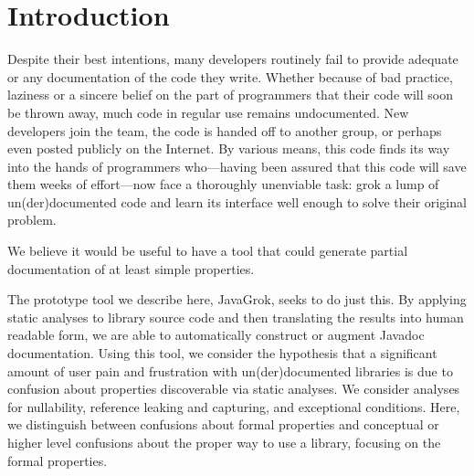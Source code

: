 \section{Introduction}

Despite their best intentions, many developers routinely fail to provide
adequate or any documentation of the code they write.  Whether because of bad
practice, laziness or a sincere belief on the part of programmers that their
code will soon be thrown away, much code in regular use remains undocumented.
New developers join the team, the code is handed off to another group, or
perhaps even posted publicly on the Internet.  By various means, this code
finds its way into the hands of programmers who---having been assured that this
code will save them weeks of effort---now face a thoroughly unenviable task:
grok a lump of un(der)documented code and learn its interface well enough
to solve their original problem.


We believe it would be useful to have a tool that could generate partial
documentation of at least simple properties.

The prototype tool we describe here, JavaGrok, seeks to do just this.  By
applying static analyses to library source code and then
translating the results into human readable form, we are able to
automatically construct or augment Javadoc documentation.
Using this tool, we
consider the hypothesis that a significant amount of user pain and frustration
with un(der)documented libraries is due to confusion about
properties discoverable via static analyses. We consider analyses for nullability,
reference leaking and capturing, and exceptional conditions.
Here, we distinguish between confusions about formal properties
and conceptual
or higher level confusions about the proper way to use a library, focusing on
the formal properties.

